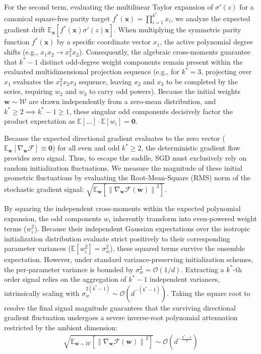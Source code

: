\documentclass{article}
\newcommand{\E}{\mathbb{E}}
\newcommand{\1}{\mathbb{I}}
\newcommand{\norm}[1]{\left\lVert#1\right\rVert}
\newcommand{\calO}{\mathcal{O}}
\newcommand{\calF}{\mathcal{F}}
\newcommand{\calW}{\mathcal{W}}
\newcommand{\bx}{\mathbf{x}}
\newcommand{\bw}{\mathbf{w}}
\begin{document}
For the second term, evaluating the multilinear Taylor expansion of $\sigma'(z)$ for a canonical square-free parity target $f^*(\bx) = \prod_{i=1}^{k^*} x_i$, we analyze the expected gradient drift $\E_{\bx}[f^*(\bx) \sigma'(z) \bx]$. When multiplying the symmetric parity function $f^*(\bx)$ by a specific coordinate vector $x_1$, the active polynomial degree shifts (e.g., $x_1 x_2 \to x_1^2 x_2$). Consequently, the algebraic cross-moments guarantee that $k^*-1$ distinct odd-degree weight components remain present within the evaluated multidimensional projection sequence (e.g., for $k^*=3$, projecting over $x_1$ evaluates the $x_1^2 x_2 x_3$ sequence, leaving $x_2$ and $x_3$ to be completed by the series, requiring $w_2$ and $w_3$ to carry odd powers). Because the initial weights $\bw \sim \calW$ are drawn independently from a zero-mean distribution, and $k^* \ge 2 \implies k^*-1 \ge 1$, these singular odd components decisively factor the product expectation as $\E[\dots] \cdot \E[w_i] = \mathbf{0}$. 

Because the expected directional gradient evaluates to the zero vector ($\E_{\bw}[\nabla_\bw \calF] \equiv \mathbf{0}$) for all even and odd $k^* \ge 2$, the deterministic gradient flow provides zero signal. Thus, to escape the saddle, SGD must exclusively rely on random initialization fluctuations. We measure the magnitude of these initial geometric fluctuations by evaluating the Root-Mean-Square (RMS) norm of the stochastic gradient signal: $\sqrt{\E_{\bw}[\norm{\nabla_\bw \calF(\bw)}^2]}$. 

By squaring the independent cross-moments within the expected polynomial expansion, the odd components $w_i$ inherently transform into even-powered weight terms ($w_i^2$). Because their independent Gaussian expectations over the isotropic initialization distribution evaluate strict positively to their corresponding parameter variances ($\E[w_i^2] = \sigma_w^2$), these squared terms survive the ensemble expectation. However, under standard variance-preserving initialization schemes, the per-parameter variance is bounded by $\sigma_w^2 = \calO(1/d)$. Extracting a $k^*$-th order signal relies on the aggregation of $k^*-1$ independent variances, intrinsically scaling with $\sigma_w^{2(k^*-1)} \sim \calO(d^{-(k^*-1)})$. Taking the square root to resolve the final signal magnitude guarantees that the surviving directional gradient fluctuation undergoes a severe inverse-root polynomial attenuation restricted by the ambient dimension:
\begin{align}
    \sqrt{\E_{\bw \sim \calW}[\norm{\nabla_\bw \calF(\bw)}^2]} \sim \calO\left(d^{-\frac{k^*-1}{2}}\right)
\end{align}
\end{document}
